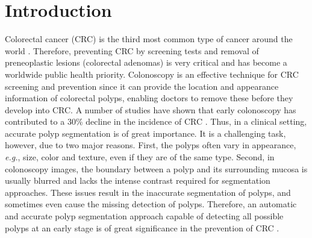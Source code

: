 \documentclass[runningheads]{llncs}
\def\eg{\emph{e.g.}}
\begin{document}
\section{Introduction}
Colorectal cancer (CRC) is the third most common type of cancer around the world \cite{silva2014toward}. Therefore, preventing CRC by screening tests and removal of preneoplastic lesions (colorectal adenomas) is very critical and has become a worldwide public health priority.
Colonoscopy is an effective technique for CRC screening and prevention since it can provide the location and appearance information of colorectal polyps, enabling doctors to remove these before they develop into CRC. A number of studies have shown that early colonoscopy has contributed to a 30\% decline in the incidence of CRC \cite{haggar2009colorectal}.
Thus, in a clinical setting, accurate polyp segmentation is of great importance. It is a challenging task, however, due to two major reasons. First, the polyps often vary in appearance, \eg, size, color and texture, even if they are of the same type. Second, in colonoscopy images, the boundary between a polyp and its surrounding mucosa is usually blurred and lacks the intense contrast required for segmentation approaches. These issues result in the inaccurate segmentation of polyps, and sometimes even cause the missing detection of polyps.
Therefore, an automatic and accurate polyp segmentation approach capable of detecting all possible polyps at an early stage is of great significance in the prevention of CRC \cite{jia2019wireless}.
\end{document}
